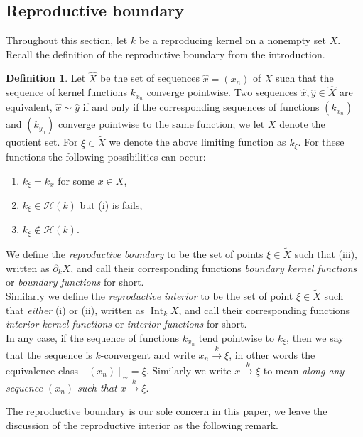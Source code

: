 \documentclass[leqno, final]{article}
\theoremstyle{definition}
\newtheorem{definition}{Definition}
\newcommand{\xto}[1]{\stackrel{#1}{\to}}
\newcommand{\Hilbert}{\mathcal{H}}
\DeclareMathOperator{\Int}{Int}
\begin{document}
\subsection{Reproductive boundary}
Throughout this section, let $k$ be a reproducing kernel on a nonempty set $X$.
Recall the definition of the reproductive boundary from the introduction.
\begin{definition}
Let $\widehat X$ be the set of sequences $\hat x=(x_n)$ of $X$ such that the sequence
of kernel functions $k_{x_n}$ converge pointwise. Two sequences $\hat x,\hat y\in\widehat X$
are equivalent, $\hat x\sim\hat y$ if and only if the corresponding sequences of functions
$(k_{x_n})$ and $(k_{y_n})$ converge pointwise to the same function; we let $\widetilde X$
denote the quotient set. For $\xi\in\widetilde X$ we denote the above limiting function
as $k_\xi$. For these functions the following possibilities can occur:
\begin{enumerate}[label=(\roman*)]
\item $k_\xi = k_x$ for some $x\in X$,
\item $k_\xi\in\Hilbert(k)$ but (i) is fails,
\item $k_\xi\notin\Hilbert(k)$.
\end{enumerate}
We define the \emph{reproductive boundary} to be the set of points $\xi\in\widetilde X$
such that (iii), written as $\partial_kX$, and call their corresponding functions
\emph{boundary kernel functions} or \emph{boundary functions} for short.
\\ Similarly we define the \emph{reproductive interior} to be the set of point $\xi\in\widetilde X$
such that \emph{either} (i) or (ii), written as $\Int_kX$, and call their corresponding
functions \emph{interior kernel functions} or \emph{interior functions} for short.
\\ In any case, if the sequence of functions $k_{x_n}$ tend pointwise to $k_\xi$,
then we say that the sequence is $k$-convergent and write $x_n\xto{k}\xi$, in other words
the equivalence class $[(x_n)]_\sim = \xi$. Similarly
we write $x\xto{k}\xi$ to mean \emph{along any sequence $(x_n)$ such that $x\xto{k}\xi$}.
\end{definition}
The reproductive boundary is our sole concern in this paper, we leave the discussion
of the reproductive interior as the following remark.
\end{document}
